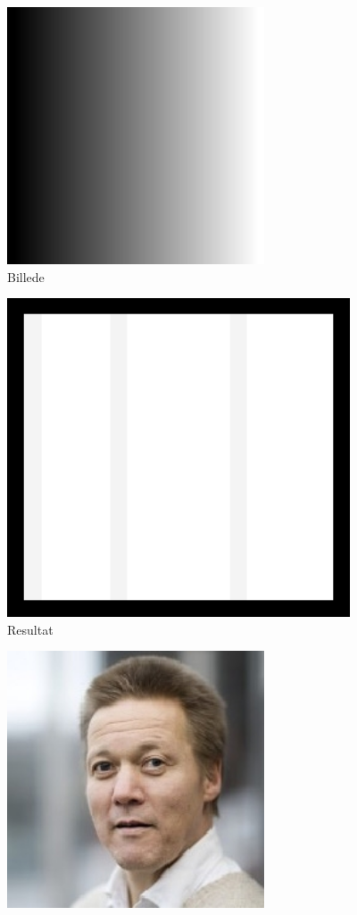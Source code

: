 \documentclass{article}
\begin{document}
\begin{itemize}
\begin{figure}
	\end{figure}
	\begin{figure}
		\centering
		\includegraphics[width=3in]{test2.png}
		\caption{Billede}
		\label{ke2}
	\end{figure}
	\begin{figure}
		\centering
		\includegraphics[width=4in]{test2_result.png}
		\caption{Resultat}
		\label{ke2r}
	\end{figure}
	\begin{figure}
		\centering
		\includegraphics[width=3in]{test3.jpg}

\end{figure}
\end{itemize}
\end{document}
